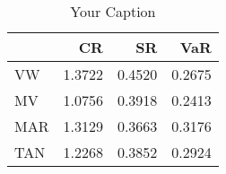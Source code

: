 \begin{table}
\caption{Your Caption}
\label{your:label}
\begin{tabular}{lrrr}
\toprule
 & CR & SR & VaR \\
\midrule
VW & 1.3722 & 0.4520 & 0.2675 \\
MV & 1.0756 & 0.3918 & 0.2413 \\
MAR & 1.3129 & 0.3663 & 0.3176 \\
TAN & 1.2268 & 0.3852 & 0.2924 \\
\bottomrule
\end{tabular}
\end{table}
